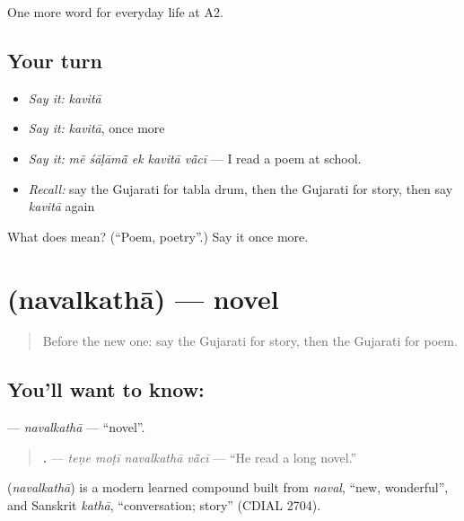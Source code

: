 \begin{grammarlens}[title={What you've built}]
One more word for everyday life at A2.
\end{grammarlens}

\subsection*{Your turn}
\begin{itemize}
\raggedright
  \item \emph{Say it:} \emph{kavitā}
  \item \emph{Say it:} \emph{kavitā}, once more
  \item \emph{Say it:} \emph{mẽ śāḷāmā̃ ek kavitā vā̃cī} — I read a poem at school.
  \item \emph{Recall:} say the Gujarati for tabla drum, then the Gujarati for story, then say \emph{kavitā} again
\end{itemize}

\begin{tcolorbox}[breakable,colback=teal!4,colframe=teal!35!black,title={Before you move on}]
What does  mean? (\textquotedblleft{}Poem, poetry\textquotedblright{}.) Say it once more.
\end{tcolorbox}
\section[\texorpdfstring{\gu{નવલકથા} (navalkathā)}{નવલકથા (navalkathā)}]{ (navalkathā) — novel}

\label{lesson:GU-C255-navalkatha}



\begin{quote}
Before the new one: say the Gujarati for story, then the Gujarati for poem.
\end{quote}

\subsection*{You'll want to know: }
\textbf{} — \emph{navalkathā} — \textquotedblleft{}novel\textquotedblright{}.

\begin{quote}
\textbf{   .} — \emph{teṇe moṭī navalkathā vā̃cī} — \textquotedblleft{}He read a long novel.\textquotedblright{}
\end{quote}

\begin{cousinweb}
\textbf{} (\emph{navalkathā}) is a modern learned compound built from \emph{naval}, \textquotedblleft{}new, wonderful\textquotedblright{}, and Sanskrit \emph{kathā}, \textquotedblleft{}conversation; story\textquotedblright{} (CDIAL 2704).
\end{cousinweb}

